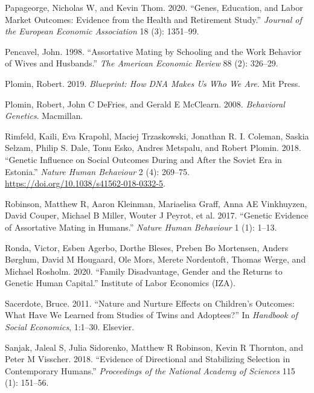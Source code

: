 \documentclass[
]{article}
\newlength{\cslhangindent}
\newlength{\cslentryspacingunit} %
\newenvironment{CSLReferences}[2] %
 {%
  \setlength{\parindent}{0pt}
  \ifodd #1
  \let\oldpar\par
  \def\par{\hangindent=\cslhangindent\oldpar}
  \fi
  \setlength{\parskip}{#2\cslentryspacingunit}
 }%
 {}
\theoremstyle{definition}
\theoremstyle{definition}
\theoremstyle{definition}
\theoremstyle{definition}
\theoremstyle{remark}
\begin{document}
\begin{CSLReferences}{1}{0}
\leavevmode{}%
Papageorge, Nicholas W, and Kevin Thom. 2020. {``Genes, Education, and Labor Market Outcomes: Evidence from the Health and Retirement Study.''} \emph{Journal of the European Economic Association} 18 (3): 1351--99.

\leavevmode{}%
Pencavel, John. 1998. {``Assortative Mating by Schooling and the Work Behavior of Wives and Husbands.''} \emph{The American Economic Review} 88 (2): 326--29.

\leavevmode{}%
Plomin, Robert. 2019. \emph{Blueprint: How DNA Makes Us Who We Are}. Mit Press.

\leavevmode{}%
Plomin, Robert, John C DeFries, and Gerald E McClearn. 2008. \emph{Behavioral Genetics}. Macmillan.

\leavevmode{}%
Rimfeld, Kaili, Eva Krapohl, Maciej Trzaskowski, Jonathan R. I. Coleman, Saskia Selzam, Philip S. Dale, Tonu Esko, Andres Metspalu, and Robert Plomin. 2018. {``Genetic Influence on Social Outcomes During and After the Soviet Era in Estonia.''} \emph{Nature Human Behaviour} 2 (4): 269--75. \url{https://doi.org/10.1038/s41562-018-0332-5}.

\leavevmode{}%
Robinson, Matthew R, Aaron Kleinman, Mariaelisa Graff, Anna AE Vinkhuyzen, David Couper, Michael B Miller, Wouter J Peyrot, et al. 2017. {``Genetic Evidence of Assortative Mating in Humans.''} \emph{Nature Human Behaviour} 1 (1): 1--13.

\leavevmode{}%
Ronda, Victor, Esben Agerbo, Dorthe Bleses, Preben Bo Mortensen, Anders Børglum, David M Hougaard, Ole Mors, Merete Nordentoft, Thomas Werge, and Michael Rosholm. 2020. {``Family Disadvantage, Gender and the Returns to Genetic Human Capital.''} Institute of Labor Economics (IZA).

\leavevmode{}%
Sacerdote, Bruce. 2011. {``Nature and Nurture Effects on Children's Outcomes: What Have We Learned from Studies of Twins and Adoptees?''} In \emph{Handbook of Social Economics}, 1:1--30. Elsevier.

\leavevmode{}%
Sanjak, Jaleal S, Julia Sidorenko, Matthew R Robinson, Kevin R Thornton, and Peter M Visscher. 2018. {``Evidence of Directional and Stabilizing Selection in Contemporary Humans.''} \emph{Proceedings of the National Academy of Sciences} 115 (1): 151--56.


\end{CSLReferences}
\end{document}
